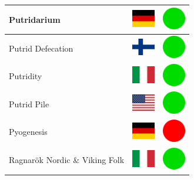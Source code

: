 \documentclass[12pt, a4paper, twoside]{report}
\begin{document}
\begin{center}
\begin{longtable}{|p{5cm}|p{2cm}|p{2cm}|}
 Putridarium                                                & \includegraphics[width=1cm]{../img/flags/de} &   \includegraphics[width=1cm]{../likes/y} \\ \hline
 Putrid Defecation                                          & \includegraphics[width=1cm]{../img/flags/fi} &   \includegraphics[width=1cm]{../likes/y} \\ \hline
 Putridity                                                  & \includegraphics[width=1cm]{../img/flags/it} &   \includegraphics[width=1cm]{../likes/y} \\ \hline
 Putrid Pile                                                & \includegraphics[width=1cm]{../img/flags/us} &   \includegraphics[width=1cm]{../likes/y} \\ \hline
 Pyogenesis                                                 & \includegraphics[width=1cm]{../img/flags/de} &   \includegraphics[width=1cm]{../likes/n} \\ \hline
 Ragnarök Nordic \& Viking Folk                             & \includegraphics[width=1cm]{../img/flags/it} &   \includegraphics[width=1cm]{../likes/y} \\ \hline

\end{longtable}
\end{center}
\end{document}
